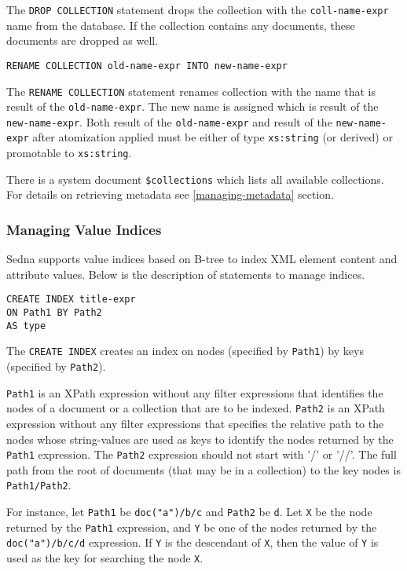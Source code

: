 \documentclass[a4paper,12pt]{article}
\begin{document}
The \verb!DROP COLLECTION! statement drops the collection with the
\verb!coll-name-expr! name from the database.
If the collection contains any documents, these documents are dropped as well.

\begin{verbatim}
RENAME COLLECTION old-name-expr INTO new-name-expr
\end{verbatim}

The \verb!RENAME COLLECTION! statement renames collection with the name that is result of the \verb!old-name-expr!.
The new name is assigned which is result of the \verb!new-name-expr!.
Both result of the \verb!old-name-expr! and result of the \verb!new-name-expr! after atomization applied must be either
of type \verb!xs:string! (or derived) or promotable to \verb!xs:string!.

\hbox{}

There is a system document \verb!$collections! which lists all available collections. For details on retrieving metadata see \ref{managing-metadata} section.

\subsubsection{Managing Value Indices}
\label{sec:managing-value-indices}
Sedna supports value indices based on B-tree to index XML element content 
and attribute values. Below is the description of statements to manage indices.

\begin{verbatim}
CREATE INDEX title-expr
ON Path1 BY Path2
AS type
\end{verbatim}

The \verb!CREATE INDEX! creates an index on nodes (specified by \verb!Path1!)
by keys (specified by \verb!Path2!).

\verb!Path1! is an XPath expression without any filter expressions that
identifies the nodes of a document or a collection that are to be indexed.
\verb!Path2! is an XPath expression without any filter expressions that
specifies the relative path to the nodes whose string-values are used as keys
to identify the nodes returned by the \verb!Path1! expression. The \verb!Path2!
expression should not start with '/' or '//'. The full path from the root of
documents (that may be in a collection) to the key nodes is \verb!Path1/Path2!.

For instance, let \verb!Path1! be \verb!doc("a")/b/c! and \verb!Path2! be
\verb!d!. Let \verb!X! be the node returned by the \verb!Path1! expression, and
\verb!Y! be one of the nodes returned by the \verb!doc("a")/b/c/d! expression.
If \verb!Y! is the descendant of \verb!X!, then the value of \verb!Y! is used as
the key for searching the node \verb!X!.
\end{document}
